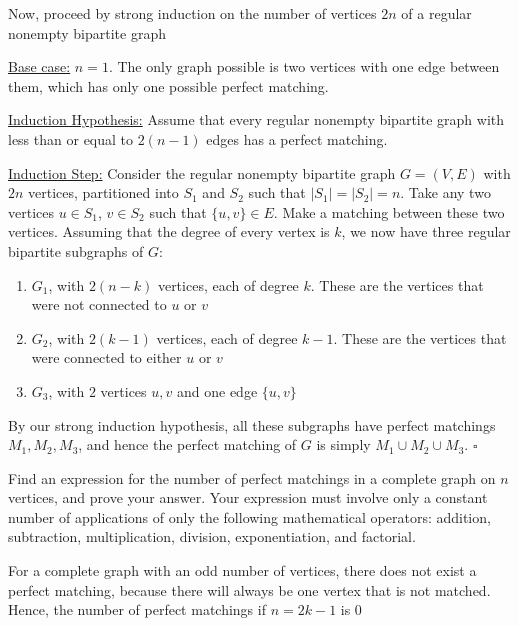 \documentclass[12pt,answers]{exam}
\begin{document}
\begin{questions}
\begin{solution}
Now, proceed by strong induction on the number of vertices $2n$ of a regular nonempty bipartite graph

\underline{Base case:} $n = 1$. The only graph possible is two vertices with one edge between them, which has only one possible perfect matching.

\underline{Induction Hypothesis:} Assume that every regular nonempty bipartite graph with less than or equal to $2(n-1)$ edges has a perfect matching.

\underline{Induction Step:} Consider the regular nonempty bipartite graph $G = (V,E)$ with $2n$ vertices, partitioned into $S_1$ and $S_2$ such that $|S_1| = |S_2| = n$. Take any two vertices $u \in S_1$, $v \in S_2$ such that $\{u,v\} \in E$. Make a matching between these two vertices. Assuming that the degree of every vertex is $k$, we now have three regular bipartite subgraphs of $G$:
\begin{enumerate}
    \item $G_1$, with $2(n-k)$ vertices, each of degree $k$. These are the vertices that were not connected to $u$ or $v$
    \item $G_2$, with $2(k-1)$ vertices, each of degree $k-1$. These are the vertices that were connected to either $u$ or $v$
    \item $G_3$, with $2$ vertices $u,v$ and one edge $\{u,v\}$
\end{enumerate}

By our strong induction hypothesis, all these subgraphs have perfect matchings $M_1, M_2, M_3$, and hence the perfect matching of $G$ is simply $M_1 \cup M_2 \cup M_3$. \hfill $\square$
\end{solution}

\question Find an expression for the number of perfect matchings in a complete graph on $n$ vertices, and prove your answer. Your expression must involve only a constant number of applications of only the following mathematical operators: addition, subtraction, multiplication, division, exponentiation, and factorial.
\begin{solution}
For a complete graph with an odd number of vertices, there does not exist a perfect matching, because there will always be one vertex that is not matched. Hence, the number of perfect matchings if $n = 2k-1$ is $\boxed{0}$


\end{solution}
\end{questions}
\end{document}
